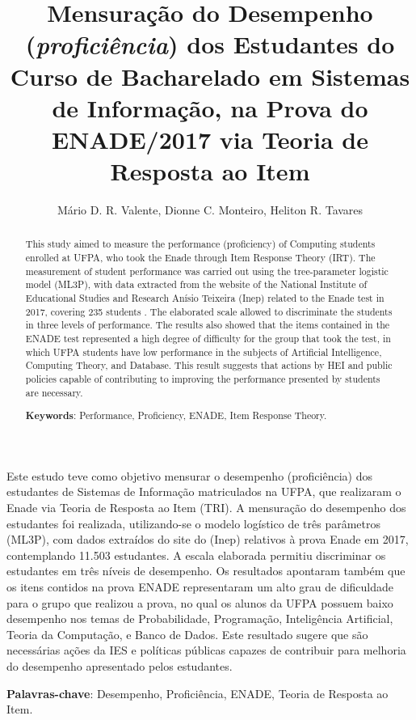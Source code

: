 \documentclass[12pt]{article}
\title{Mensuração do Desempenho (\textit{proficiência}) dos Estudantes do Curso de Bacharelado em Sistemas de Informação, na Prova do ENADE/2017 via Teoria de Resposta ao Item}
\author{Mário D. R. Valente\inst{1}, Dionne C. Monteiro\inst{2}, Heliton R. Tavares \inst{3}}
\begin{document}
 

\maketitle

\begin{abstract}
 This study aimed to measure the performance (proficiency) of Computing students enrolled at UFPA, who took the Enade through Item Response Theory (IRT). The measurement of student performance was carried out using the tree-parameter logistic model (ML3P), with data extracted from the website of the National Institute of Educational Studies and Research Anísio Teixeira (Inep) related to the Enade test in 2017, covering 235 students . The elaborated scale allowed to discriminate the students in three levels of performance. The results also showed that the items contained in the ENADE test represented a high degree of difficulty for the group that took the test, in which UFPA students have low performance in the subjects of Artificial Intelligence, Computing Theory, and Database. This result suggests that actions by HEI and public policies capable of contributing to improving the performance presented by students are necessary.
  
\noindent
  \textbf{Keywords}: Performance, Proficiency, ENADE, Item Response Theory.
\end{abstract}

\begin{resumo} 
Este estudo teve como objetivo mensurar o desempenho (proficiência) dos estudantes de Sistemas de Informação matriculados na UFPA, que realizaram o Enade via Teoria de Resposta ao Item (TRI). A mensuração do desempenho dos estudantes foi realizada, utilizando-se o modelo logístico de três parâmetros (ML3P), com dados extraídos do site do (Inep) relativos à prova Enade em 2017, contemplando 11.503 estudantes. A escala elaborada permitiu discriminar os estudantes em três níveis de desempenho. Os resultados apontaram também que os itens contidos na prova ENADE representaram um alto grau de dificuldade para o grupo que realizou a prova, no qual os alunos da UFPA possuem baixo desempenho nos temas de Probabilidade, Programação, Inteligência Artificial, Teoria da Computação, e Banco de Dados. Este resultado sugere que são necessárias ações da IES e políticas públicas capazes de contribuir para melhoria do desempenho apresentado pelos estudantes.
  
\noindent
  \textbf{Palavras-chave}: Desempenho, Proficiência, ENADE, Teoria de Resposta ao Item.
\end{resumo}
\end{document}
